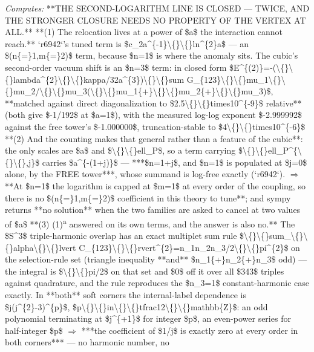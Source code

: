 \begin{description}
\emph{Computes:} **THE SECOND-LOGARITHM LINE IS CLOSED --- TWICE, AND THE STRONGER CLOSURE NEEDS NO PROPERTY OF THE VERTEX AT ALL.**  **(1) The relocation lives at a power of \$a\$ the interaction cannot reach.** `r6942`'s tuned term is \$c\_2a\textasciicircum{}\{-1\}\textbackslash\{\}\textbackslash\{\}ln\textasciicircum{}\{2\}a\$ --- an \$(n\{=\}1,m\{=\}2)\$ term, because \$n=1\$ is where the anomaly sits. The cubic's second-order vacuum shift is an \$n=3\$ term: in closed form \$E\textasciicircum{}\{(2)\}=-(\textbackslash\{\}\textbackslash\{\}lambda\textasciicircum{}\{2\}\textbackslash\{\}\textbackslash\{\}kappa/32a\textasciicircum{}\{3\})\textbackslash\{\}\textbackslash\{\}sum G\_\{123\}\textbackslash\{\}\textbackslash\{\}mu\_1\textbackslash\{\}\textbackslash\{\}mu\_2/\textbackslash\{\}\textbackslash\{\}mu\_3(\textbackslash\{\}\textbackslash\{\}mu\_1\{+\}\textbackslash\{\}\textbackslash\{\}mu\_2\{+\}\textbackslash\{\}\textbackslash\{\}mu\_3)\$, **matched against direct diagonalization to \$2.5\textbackslash\{\}\textbackslash\{\}times10\textasciicircum{}\{-9\}\$ relative** (both give \$-1/192\$ at \$a=1\$), with the measured log-log exponent \$-2.999992\$ against the free tower's \$-1.000000\$, truncation-stable to \$4\textbackslash\{\}\textbackslash\{\}times10\textasciicircum{}\{-6\}\$  **(2) And the counting makes that general rather than a feature of the cubic**: the only scales are \$a\$ and \$\textbackslash\{\}\textbackslash\{\}ell\_P\$, so a term carrying \$\textbackslash\{\}\textbackslash\{\}ell\_P\textasciicircum{}\{\textbackslash\{\}\textbackslash\{\},j\}\$ carries \$a\textasciicircum{}\{-(1+j)\}\$ --- ***\$n=1+j\$, and \$n=1\$ is populated at \$j=0\$ alone, by the FREE tower***, whose summand is log-free exactly (`r6942`). \ensuremath{\Rightarrow} **At \$n=1\$ the logarithm is capped at \$m=1\$ at every order of the coupling, so there is no \$(n\{=\}1,m\{=\}2)\$ coefficient in this theory to tune**; and sympy returns **no solution** when the two families are asked to cancel at two values of \$a\$  **(3) (1)\textsuperscript{a} answered on its own terms, and the answer is also no.** The \$S\textasciicircum{}3\$ triple-harmonic overlap has an exact multiplet sum rule \$\textbackslash\{\}\textbackslash\{\}sum\_\textbackslash\{\}\textbackslash\{\}alpha\textbackslash\{\}\textbackslash\{\}lvert C\_\{123\}\textbackslash\{\}\textbackslash\{\}rvert\textasciicircum{}\{2\}=n\_1n\_2n\_3/2\textbackslash\{\}\textbackslash\{\}pi\textasciicircum{}\{2\}\$ on the selection-rule set (triangle inequality **and** \$n\_1\{+\}n\_2\{+\}n\_3\$ odd) --- the integral is \$\textbackslash\{\}\textbackslash\{\}pi/2\$ on that set and \$0\$ off it over all \$343\$ triples against quadrature, and the rule reproduces the \$n\_3=1\$ constant-harmonic case exactly. In **both** soft corners the internal-label dependence is \$j(j\textasciicircum{}\{2\}-3)\textasciicircum{}\{p\}\$, \$p\textbackslash\{\}\textbackslash\{\}in\textbackslash\{\}\textbackslash\{\}tfrac12\textbackslash\{\}\textbackslash\{\}mathbb\{Z\}\$: an odd polynomial terminating at \$j\textasciicircum{}\{+1\}\$ for integer \$p\$, an even-power series for half-integer \$p\$ \ensuremath{\Rightarrow} ***the coefficient of \$1/j\$ is exactly zero at every order in both corners*** --- no harmonic number, no 
\end{description}

